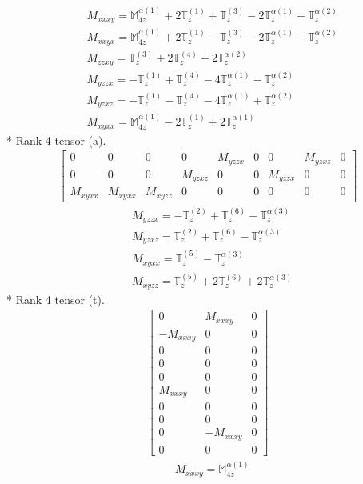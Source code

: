 \documentclass[fleqn,8pt,landscape]{jsarticle}
\begin{document}
\begin{align*}
& M_{xxxy} = \mathbb{M}_{4z}^{\alpha(1)} + 2 \mathbb{T}_{z}^{(1)} + \mathbb{T}_{z}^{(3)} - 2 \mathbb{T}_{z}^{\alpha(1)} - \mathbb{T}_{z}^{\alpha(2)} \\
& M_{xxyx} = \mathbb{M}_{4z}^{\alpha(1)} + 2 \mathbb{T}_{z}^{(1)} - \mathbb{T}_{z}^{(3)} - 2 \mathbb{T}_{z}^{\alpha(1)} + \mathbb{T}_{z}^{\alpha(2)} \\
& M_{zzxy} = \mathbb{T}_{z}^{(3)} + 2 \mathbb{T}_{z}^{(4)} + 2 \mathbb{T}_{z}^{\alpha(2)} \\
& M_{yzzx} = - \mathbb{T}_{z}^{(1)} + \mathbb{T}_{z}^{(4)} - 4 \mathbb{T}_{z}^{\alpha(1)} - \mathbb{T}_{z}^{\alpha(2)} \\
& M_{yzxz} = - \mathbb{T}_{z}^{(1)} - \mathbb{T}_{z}^{(4)} - 4 \mathbb{T}_{z}^{\alpha(1)} + \mathbb{T}_{z}^{\alpha(2)} \\
& M_{xyxx} = \mathbb{M}_{4z}^{\alpha(1)} - 2 \mathbb{T}_{z}^{(1)} + 2 \mathbb{T}_{z}^{\alpha(1)}
\end{align*}
* Rank 4 tensor (a).
\begin{align*}
\begin{bmatrix} 0 & 0 & 0 & 0 & M_{yzzx} & 0 & 0 & M_{yzxz} & 0 \\ 0 & 0 & 0 & M_{yzxz} & 0 & 0 & M_{yzzx} & 0 & 0 \\ M_{xyxx} & M_{xyxx} & M_{xyzz} & 0 & 0 & 0 & 0 & 0 & 0 \end{bmatrix}
\end{align*}
\begin{align*}
& M_{yzzx} = - \mathbb{T}_{z}^{(2)} + \mathbb{T}_{z}^{(6)} - \mathbb{T}_{z}^{\alpha(3)} \\
& M_{yzxz} = \mathbb{T}_{z}^{(2)} + \mathbb{T}_{z}^{(6)} - \mathbb{T}_{z}^{\alpha(3)} \\
& M_{xyxx} = \mathbb{T}_{z}^{(5)} - \mathbb{T}_{z}^{\alpha(3)} \\
& M_{xyzz} = \mathbb{T}_{z}^{(5)} + 2 \mathbb{T}_{z}^{(6)} + 2 \mathbb{T}_{z}^{\alpha(3)}
\end{align*}
* Rank 4 tensor (t).
\begin{align*}
\begin{bmatrix} 0 & M_{xxxy} & 0 \\ - M_{xxxy} & 0 & 0 \\ 0 & 0 & 0 \\ 0 & 0 & 0 \\ 0 & 0 & 0 \\ M_{xxxy} & 0 & 0 \\ 0 & 0 & 0 \\ 0 & 0 & 0 \\ 0 & - M_{xxxy} & 0 \\ 0 & 0 & 0 \end{bmatrix}
\end{align*}
\begin{align*}
& M_{xxxy} = \mathbb{M}_{4z}^{\alpha(1)}
\end{align*}
\end{document}

